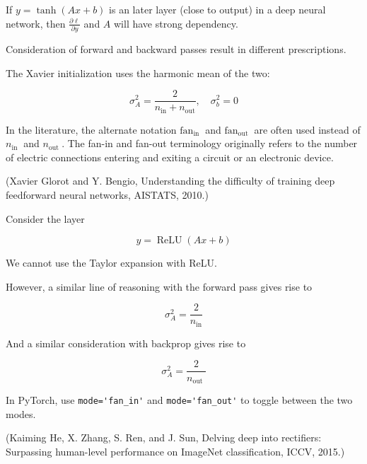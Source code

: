\begin{definition}
    If $y=\tanh (A x+b)$ is an later layer (close to output) in a deep neural network, then $\frac{\partial \ell}{\partial y}$ and $A$ will have strong dependency.

    \par\noindent\textcolor{gray}{\hdashrule{\textwidth}{0.4pt}{1pt 2pt}}

    Consideration of forward and backward passes result in different prescriptions.

    The Xavier initialization uses the harmonic mean of the two:

    $$
    \sigma_{A}^{2}=\frac{2}{n_{\mathrm{in}}+n_{\mathrm{out}}}, \quad \sigma_{b}^{2}=0
    $$

    In the literature, the alternate notation $\text{fan}_{\text {in }}$ and $\text{fan}_{\text {out }}$ are often used instead of $n_{\text {in }}$ and $n_{\text {out }}$. The fan-in and fan-out terminology originally refers to the number of electric connections entering and exiting a circuit or an electronic device.

    (Xavier Glorot and Y. Bengio, Understanding the difficulty of training deep feedforward neural networks, AISTATS, 2010.)
\end{definition}

\begin{definition}
    Consider the layer

    $$
    y=\operatorname{ReLU}(A x+b)
    $$

    We cannot use the Taylor expansion with ReLU.

    However, a similar line of reasoning with the forward pass gives rise to

    $$
    \sigma_{A}^{2}=\frac{2}{n_{\mathrm{in}}}
    $$

    And a similar consideration with backprop gives rise to

    $$
    \sigma_{A}^{2}=\frac{2}{n_{\text {out }}}
    $$

    In PyTorch, use \verb|mode='fan_in'| and \verb|mode='fan_out'| to toggle between the two modes.

    (Kaiming He, X. Zhang, S. Ren, and J. Sun, Delving deep into rectifiers: Surpassing human-level performance on ImageNet classification, ICCV, 2015.)
\end{definition}

